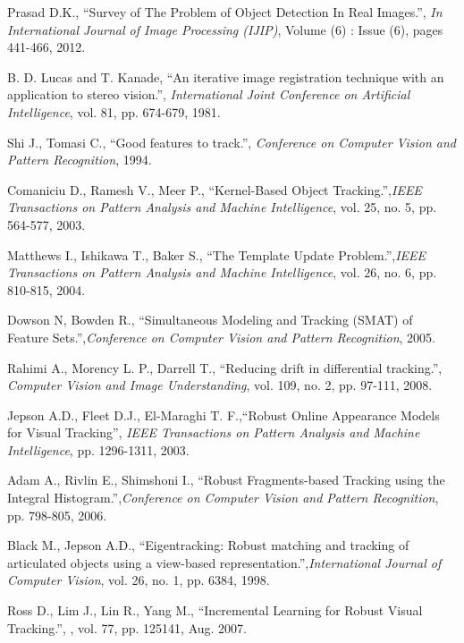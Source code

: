 \begin{thebibliography}{SMAT}
 Prasad D.K., ``Survey of The Problem of Object Detection In Real Images.'', \textit{In International Journal of Image Processing (IJIP)}, Volume (6) : Issue (6), pages 441-466, 2012.

 B. D. Lucas and T. Kanade, ``An iterative image registration technique with an application to stereo vision.'', \textit{International Joint Conference on Artificial Intelligence}, vol. 81, pp. 674-679, 1981.

 Shi J., Tomasi C., ``Good features to track.'', \textit{Conference on Computer Vision and Pattern Recognition}, 1994.

 Comaniciu D., Ramesh V., Meer P., ``Kernel-Based Object Tracking.'',\textit{IEEE Transactions on Pattern Analysis and Machine Intelligence}, vol. 25, no. 5, pp. 564-577, 2003.

 Matthews I., Ishikawa T., Baker S., ``The Template Update Problem.'',\textit{IEEE Transactions on Pattern Analysis and Machine Intelligence}, vol. 26, no. 6, pp. 810-815, 2004.

 Dowson N, Bowden R., ``Simultaneous Modeling and Tracking (SMAT) of Feature Sets.'',\textit{Conference on Computer Vision and Pattern Recognition}, 2005.

 Rahimi A., Morency L. P., Darrell T., ``Reducing drift in differential tracking.'', \textit{Computer Vision and Image Understanding}, vol. 109, no. 2, pp. 97-111, 2008.

 Jepson A.D., Fleet D.J., El-Maraghi T. F.,``Robust Online Appearance Models for Visual Tracking'', \textit{IEEE Transactions on Pattern Analysis and Machine Intelligence}, pp. 1296-1311, 2003.

Adam A., Rivlin E., Shimshoni I., ``Robust Fragments-based Tracking using the Integral Histogram.'',\textit{Conference on Computer Vision and Pattern Recognition}, pp. 798-805, 2006.

 Black M., Jepson A.D., ``Eigentracking: Robust matching and tracking of articulated objects using a view-based representation.'',\textit{International Journal of Computer Vision}, vol. 26, no. 1, pp. 63\textendash{}84, 1998.

 Ross D., Lim J., Lin R., Yang M., ``Incremental Learning for Robust Visual Tracking.'', , vol. 77, pp. 125\textendash{}141, Aug. 2007.


\end{thebibliography}
